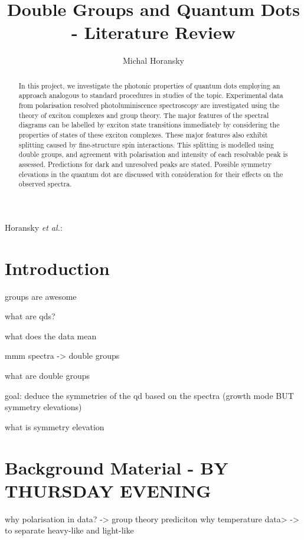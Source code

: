 \documentclass[journal]{Imperial_lab_report}
\begin{document}
\title{Double Groups and Quantum Dots - Literature Review}%
\author{Michal Horansky}


%
{Horansky \MakeLowercase{\textit{et al.}}:}

\maketitle

\begin{abstract}

In this project, we investigate the photonic properties of quantum dots employing an approach analogous to standard procedures in studies of the topic. Experimental data from polarisation resolved photoluminiscence spectroscopy are investigated using the theory of exciton complexes and group theory. The major features of the spectral diagrams can be labelled by exciton state transitions immediately by considering the properties of states of these exciton complexes. These major features also exhibit splitting caused by fine-structure spin interactions. This splitting is modelled using double groups, and agreement with polarisation and intensity of each resolvable peak is assessed. Predictions for dark and unresolved peaks are stated. Possible symmetry elevations in the quantum dot are discussed with consideration for their effects on the observed spectra.

\end{abstract}


\section{Introduction}
 groups are awesome

what are qds?

what does the data mean

	mmm spectra -> double groups
	
what are double groups

goal: deduce the symmetries of the qd based on the spectra
(growth mode BUT symmetry elevations)

what is symmetry elevation

\section{Background Material - BY THURSDAY EVENING}

why polarisation in data? -> group theory prediciton
why temperature data> -> to separate heavy-like and light-like
\end{document}
